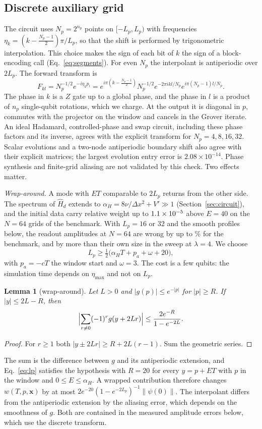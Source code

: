 \documentclass[11pt,a4paper]{article}
\newtheorem{lemma}[proposition]{Lemma}
\theoremstyle{remark}
\newcommand{\x}{\mathbf x}
\newcommand{\Hd}{\hat H_d}
\begin{document}
\subsection{Discrete auxiliary grid}
\label{sec:wrap}

The circuit uses $N_p=2^{n_p}$ points on $[-L_p,L_p)$ with
frequencies $\eta_k=(k-\tfrac{N_p-1}2)\pi/L_p$, so that the shift is
performed by trigonometric interpolation. This choice makes the sign of each
bit of $k$ the sign of a block-encoding call (Eq.~\eqref{eq:segments}). For even $N_p$
the interpolant is antiperiodic over $2L_p$. The forward transform is
\[
 F_{kl}=N_p^{-1/2}e^{-i\eta_kp_l}=e^{i\pi(k-\frac{N_p-1}2)}N_p^{-1/2}
 e^{-2\pi ikl/N_p}e^{i\pi(N_p-1)l/N_p}.
\]
The phase in $k$ is a $Z$ gate up to a global phase, and the phase in $l$ is a product
of $n_p$ single-qubit rotations, which we charge. At the output it is diagonal in
$p$, commutes with the projector on the window and cancels in the Grover
iterate. An ideal Hadamard, controlled-phase and swap circuit, including these
phase factors and its inverse, agrees with the explicit transform for
$N_p=4,8,16,32$. Scalar evolutions and a two-node antiperiodic boundary shift
also agree with their explicit matrices; the largest evolution entry error is
$2.08\times10^{-14}$. Phase synthesis and finite-grid aliasing are not
validated by this check. Two effects matter.

\emph{Wrap-around.} A mode with $ET$ comparable to $2L_p$ returns from the
other side. The spectrum of $\Hd$ extends to $\alpha_H=8\nu/\Delta x^2+V'\gg1$
(Section~\ref{sec:circuit}), and the initial data carry relative weight up to
$1.1\times10^{-5}$ above $E=40$ on the $N=64$ grids of the benchmark. With $L_p=16$ or
32 and the smooth profiles below, the readout amplitudes at $N=64$ are wrong by
up to \UnsafeBench\% for the benchmark, and by more than their own size in
the sweep at $\lambda=4$. We choose
\begin{equation}
 L_p\ge\tfrac12\bigl(\alpha_HT+p_a+\omega+20\bigr),
 \label{eq:lp}
\end{equation}
with $p_a=-cT$ the window start and $\omega=3$. The cost is a few qubits: the
simulation time depends on $\eta_{\max}$ and not on $L_p$.

\begin{lemma}[wrap-around]
\label{lem:wrap}
Let $L>0$ and $|g(p)|\le e^{-|p|}$ for $|p|\ge R$. If $|y|\le2L-R$, then
\[
 \Bigl|\sum_{r\ne0}(-1)^rg(y+2Lr)\Bigr|\le\frac{2e^{-R}}{1-e^{-2L}} .
\]
\end{lemma}
\begin{proof}
For $r\ge1$ both $|y\pm2Lr|\ge R+2L(r-1)$. Sum the geometric series.
\end{proof}
The sum is the difference between $g$ and its antiperiodic extension, and
Eq.~\eqref{eq:lp} satisfies the hypothesis with $R=20$ for every $y=p+ET$ with $p$ in the
window and $0\le E\le\alpha_H$. A wrapped contribution therefore changes $w(T,p,\x)$ by at most
$2e^{-20}(1-e^{-2L_p})^{-1}\|\psi(0)\|$. The interpolant differs from the antiperiodic extension
by the aliasing error, which depends on the smoothness of $g$. Both are contained in the measured
amplitude errors below, which use the discrete transform.
\end{document}
